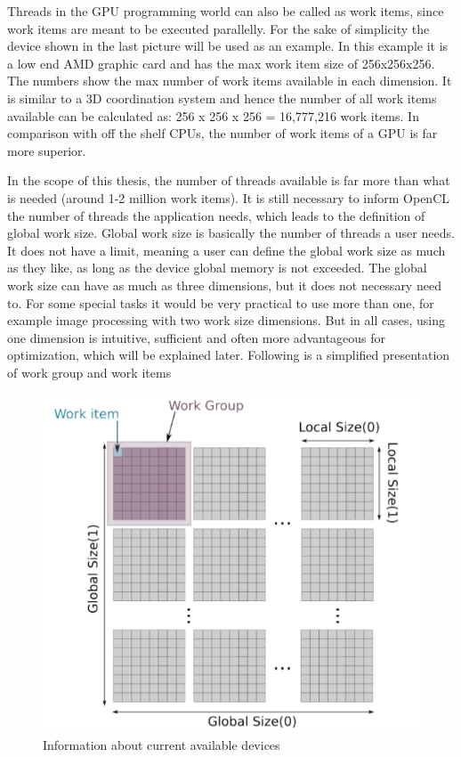 Threads in the GPU programming world can also be called as work items, since work items are meant to be executed parallelly. For the sake of simplicity the device shown in the last picture will be used as an example. In this example it is a low end AMD graphic card and has the max work item size of 256x256x256. The numbers show the max number of work items available in each dimension. It is similar to a 3D coordination system and hence the number of all work items available can be calculated as: 256 x 256 x 256 = 16,777,216 work items. In comparison with off the shelf CPUs, the number of work items of a GPU is far more superior.

In the scope of this thesis, the number of threads available is far more than what is needed (around 1-2 million work items). It is still necessary to inform OpenCL the number of threads the application needs, which leads to the definition of global work size. Global work size is basically  the number of threads a user needs. It does not have a limit, meaning a user can define the global work size as much as they like, as long as the device global memory is not exceeded. The global work size can have as much as three dimensions, but it does not necessary need to. For some special tasks it would be very practical to use more than one, for example image processing with two work size dimensions. But in all cases, using one dimension is intuitive, sufficient and often more advantageous for optimization, which will be explained later. Following is a simplified presentation of work group and work items\cite{openclplatform}

\begin{figure}[H]
	\centering
	\includegraphics[width=10 cm]{images/itemunit.png}
	\caption{Information about current available devices}
	\label{ExampleOCTImage}
\end{figure}


